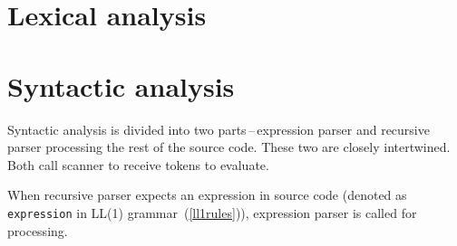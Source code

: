 \documentclass[a4paper, 11pt]{article}
\begin{document}
\section{Lexical analysis}\label{sec:LEX}

\section{Syntactic analysis}\label{sec:SYNTACTIC}
Syntactic analysis is divided into two parts\,--\,expression parser and
recursive parser processing the rest of the source code. These two are closely intertwined.
Both call scanner to receive tokens to evaluate.\par
When recursive parser expects an expression in source code (denoted as \verb|expression| in LL(1) grammar~(\ref{ll1rules})), 
expression parser is called for processing.
\end{document}
